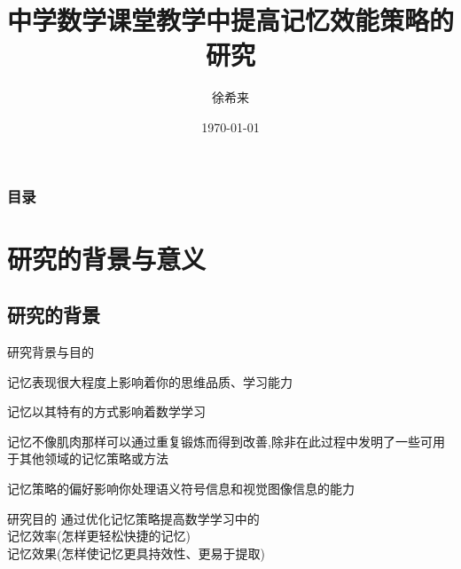 \documentclass[serif]{beamer}
\title{中学数学课堂教学中提高记忆效能策略的研究}
\author{徐希来}
\institute{数学科学学院\\华东师范大学}
\date{\scriptsize {\today}}
\begin{document}
  \begin{frame}
     \titlepage
  \end{frame}

  \begin{frame}\frametitle{目录}
  	\tableofcontents[hideallsubsections]%
  \end{frame}
  
  \section{研究的背景与意义}
  \subsection{研究的背景}
  
  \begin{frame}{研究背景与目的}
      \begin{itemize}
  \small{\item 记忆表现很大程度上影响着你的思维品质、学习能力
      	     \item 记忆以其特有的方式影响着数学学习
      	     \item 记忆不像肌肉那样可以通过重复锻炼而得到改善,除非在此过程中发明了一些可用于其他领域的记忆策略或方法
      	     \item 记忆策略的偏好影响你处理语义符号信息和视觉图像信息的能力
      	     }
      \end{itemize}
      \pause
      \begin{block}{研究目的}
      	通过优化记忆策略提高数学学习中的\\
      	记忆效率\tiny{(怎样更轻松快捷的记忆)}\\
      	\normalsize{记忆效果}\tiny {(怎样使记忆更具持效性、更易于提取)}
      \end{block}
  \end{frame}
  
\end{document}
